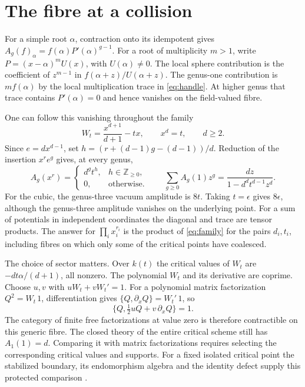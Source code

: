 \documentclass[11pt]{article}
\begin{document}
\section{The fibre at a collision}

For a simple root \(\alpha\), contraction onto its idempotent gives
\(A_g(f)_\alpha=f(\alpha)P'(\alpha)^{g-1}\). For a root of
multiplicity \(m>1\), write \(P=(x-\alpha)^m U(x)\), with
\(U(\alpha)\ne0\). The local sphere contribution is the coefficient
of \(z^{m-1}\) in \(f(\alpha+z)/U(\alpha+z)\). The genus-one
contribution is \(m f(\alpha)\) by the local multiplication trace in
\eqref{eq:handle}. At higher genus that trace contains \(P'(\alpha)=0\)
and hence vanishes on the field-valued fibre.

One can follow this vanishing throughout the family
\[
 W_t=\frac{x^{d+1}}{d+1}-tx,\qquad x^d=t,\qquad d\ge2 .
\]
Since \(e=d x^{d-1}\), set \(h=(r+(d-1)g-(d-1))/d\). Reduction of
the insertion \(x^r e^g\) gives, at every genus,
\begin{equation}
 A_g(x^r)=
 \begin{cases}d^g t^h,& h\in\mathbb Z_{\ge0},\\
                0,&\text{otherwise}.\end{cases}
 \qquad
 \sum_{g\ge0} A_g(1)z^g=\frac{d z}{1-d^d t^{d-1}z^d}.
 \label{eq:family}
\end{equation}
For the cubic, the genus-three vacuum amplitude is \(8t\). Taking
\(t=\epsilon\) gives \(8\epsilon\), although the genus-three
amplitude vanishes on the underlying point. For a sum of potentials
in independent coordinates the diagonal and trace are tensor
products. The answer for \(\prod_i x_i^{r_i}\) is the product of
\eqref{eq:family} for the pairs \(d_i,t_i\), including fibres on which
only some of the critical points have coalesced.

The choice of sector matters. Over \(k(t)\) the critical values of
\(W_t\) are \(-dt\alpha/(d+1)\), all nonzero. The polynomial \(W_t\)
and its derivative are coprime. Choose \(u,v\) with \(uW_t+vW_t'=1\).
For a polynomial matrix factorization \(Q^2=W_t\,1\), differentiation
gives \(\{Q,\partial_x Q\}=W_t'\,1\), so
\[
 \bigl\{Q,\tfrac12uQ+v\,\partial_xQ\bigr\}=1 .
\]
The category of finite free factorizations at value zero is
therefore contractible on this generic fibre. The closed theory of
the entire critical scheme still has \(A_1(1)=d\). Comparing it with
matrix factorizations requires selecting the corresponding critical
values and supports. For a fixed isolated critical point the
stabilized boundary, its endomorphism algebra and the identity
defect supply this protected comparison \cite{dyck,dm}.
\end{document}
